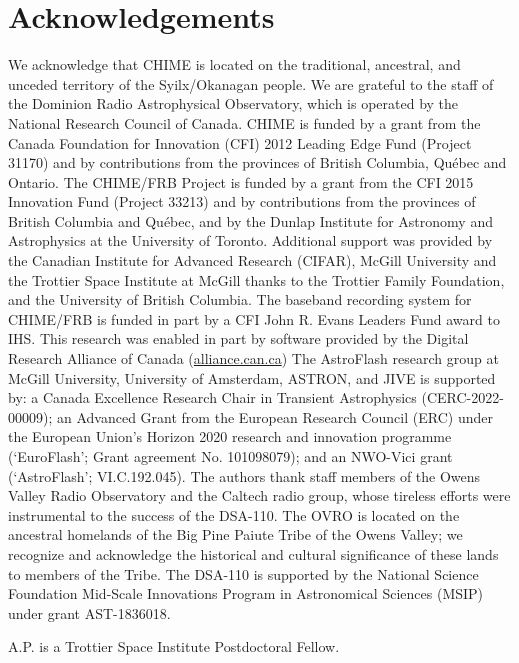 \documentclass[twocolumn, linenumbers]{aastex701}
\begin{document}
\section*{Acknowledgements}
We acknowledge that CHIME is located on the traditional, ancestral, and unceded territory of the Syilx/Okanagan people. We are grateful to the staff of the Dominion Radio Astrophysical Observatory, which is operated by the National Research Council of Canada. CHIME is funded by a grant from the Canada Foundation for Innovation (CFI) 2012 Leading Edge Fund (Project 31170) and by contributions from the provinces of British Columbia, Québec and Ontario. The CHIME/FRB Project is funded by a grant from the CFI 2015 Innovation Fund (Project 33213) and by contributions from the provinces of British Columbia and Québec, and by the Dunlap Institute for Astronomy and Astrophysics at the University of Toronto. Additional support was provided by the Canadian Institute for Advanced Research (CIFAR), McGill University and the Trottier Space Institute at McGill thanks to the Trottier Family Foundation, and the University of British Columbia. The baseband recording system for CHIME/FRB is funded in part by a CFI John R. Evans Leaders Fund award to IHS. This research was enabled in part by software provided by the Digital Research Alliance of Canada (\href{https://alliancecan.ca/}{alliance.can.ca}) The AstroFlash research group at McGill University, University of Amsterdam, ASTRON, and JIVE is supported by: a Canada Excellence Research Chair in Transient Astrophysics (CERC-2022-00009); an Advanced Grant from the European Research Council (ERC) under the European Union's Horizon 2020 research and innovation programme (`EuroFlash'; Grant agreement No. 101098079); and an NWO-Vici grant (`AstroFlash'; VI.C.192.045).
The authors thank staff members of the Owens Valley Radio Observatory and the Caltech radio group, whose tireless efforts were instrumental to the success of the DSA-110. The OVRO is located on the ancestral homelands of the Big Pine Paiute Tribe of the Owens Valley; we recognize and acknowledge the historical and cultural significance of these lands to members of the Tribe. The DSA-110 is supported by the National Science Foundation Mid-Scale Innovations Program in Astronomical Sciences (MSIP) under grant AST-1836018.

A.P. is a Trottier Space Institute Postdoctoral Fellow.




{}

\end{document}
